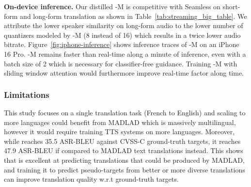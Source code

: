\textbf{On-device inference.} Our distilled \ours-M is competitive with Seamless on short-form and long-form translation as shown in Table~\ref{tab:streaming_big_table}. We attribute the lower speaker similarity on long-form audio to the lower number of quantizers modeled by \ours-M (8 instead of 16) which results in a twice lower audio bitrate.  Figure~\ref{fig:iphone-inference} shows inference traces of \ours-M on an iPhone 16 Pro. \ours-M remains faster than real-time along a minute of inference, even with a batch size of 2 which is necessary for classifier-free guidance. Training \ours-M with sliding window attention would furthermore improve real-time factor along time.

\subsubsection{Limitations}
This study focuses on a single translation task (French to English) and scaling to more languages could benefit from MADLAD which is massively multilingual, however it would require training TTS systems on more languages. Moreover, while \ours reaches 35.5 ASR-BLEU against CVSS-C ground-truth targets, it reaches 47.9 ASR-BLEU if compared to MADLAD text translations instead. This shows that \ours is excellent at predicting translations that could be produced by MADLAD, and training it to predict pseudo-targets from better or more diverse translations can improve translation quality w.r.t ground-truth targets.